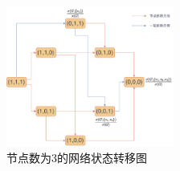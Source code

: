\begin{figure}[ht]
    \centering
    \includegraphics[width=0.49\textwidth]{网络状态转移图.pdf}
    \caption{节点数为3的网络状态转移图}
    \label{fig:网络状态转移图}
\end{figure}